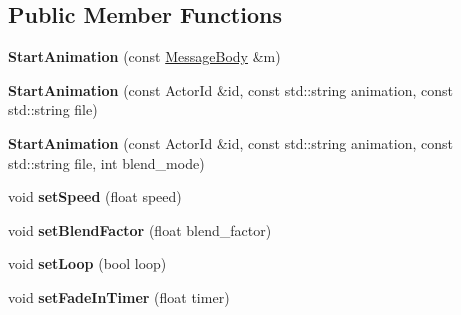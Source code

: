 \subsection*{Public Member Functions}
\begin{DoxyCompactItemize}
\item 
\mbox{\label{classTarbora_1_1Message_1_1StartAnimation_abc43c8c7fb66a6d07e37753b29051b77}} 
{\bfseries Start\+Animation} (const \hyperlink{classTarbora_1_1MessageBody}{Message\+Body} \&m)
\item 
\mbox{\label{classTarbora_1_1Message_1_1StartAnimation_a4186249b681848db881c9e1e296e2ef7}} 
{\bfseries Start\+Animation} (const Actor\+Id \&id, const std\+::string animation, const std\+::string file)
\item 
\mbox{\label{classTarbora_1_1Message_1_1StartAnimation_a743d2be7ad67e1202d42cdff5ee74c8d}} 
{\bfseries Start\+Animation} (const Actor\+Id \&id, const std\+::string animation, const std\+::string file, int blend\+\_\+mode)
\item 
\mbox{\label{classTarbora_1_1Message_1_1StartAnimation_ac01bb1e6902e542d58b5bcf0fda1633a}} 
void {\bfseries set\+Speed} (float speed)
\item 
\mbox{\label{classTarbora_1_1Message_1_1StartAnimation_a205a29366f7eda6b465bce65c17da383}} 
void {\bfseries set\+Blend\+Factor} (float blend\+\_\+factor)
\item 
\mbox{\label{classTarbora_1_1Message_1_1StartAnimation_ae09673ba9ed85daebe10e073afc4799e}} 
void {\bfseries set\+Loop} (bool loop)
\item 
\mbox{\label{classTarbora_1_1Message_1_1StartAnimation_a56f726a2b631160b50b73d54b6eaf9f6}} 
void {\bfseries set\+Fade\+In\+Timer} (float timer)
\item 
\mbox{\label{classTarbora_1_1Message_1_1StartAnimation_a13ae1b03573116aa8cda2ca5c863be72}} 

\end{DoxyCompactItemize}
